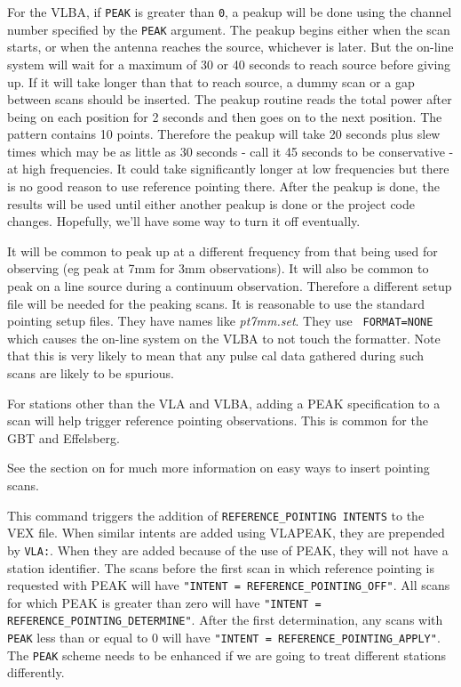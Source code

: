 \documentclass{report}
\begin{document}
For the VLBA, if {\tt PEAK} is greater than {\tt 0}, a peakup will be
done using the channel number specified by the {\tt PEAK} argument.
The peakup begins either when the scan starts, or when the antenna
reaches the source, whichever is later.  But the on-line system will
wait for a maximum of 30 or 40 seconds to reach source before giving
up. If it will take longer than that to reach source, a dummy scan or
a gap between scans should be inserted. The peakup routine reads the
total power after being on each position for 2 seconds and then goes
on to the next position. The pattern contains 10 points. Therefore the
peakup will take 20 seconds plus slew times which may be as little as
30 seconds - call it 45 seconds to be conservative - at high
frequencies. It could take significantly longer at low frequencies but
there is no good reason to use reference pointing there. After the
peakup is done, the results will be used until either another peakup
is done or the project code changes.  Hopefully, we'll have some way
to turn it off eventually.

It will be common to peak up at a different frequency from that being
used for observing (eg peak at 7mm for 3mm observations).  It will
also be common to peak on a line source during a continuum
observation.  Therefore a different setup file will be needed for the
peaking scans.  It is reasonable to use the standard pointing setup
files.  They have names like {\sl pt7mm.set}.  They use {\tt
FORMAT=NONE} which causes the on-line system on the VLBA to
not touch the formatter.  Note that this is very likely to mean
that any pulse cal data gathered during such scans are likely to
be spurious.

For stations other than the VLA and VLBA, adding a PEAK specification
to a scan will help trigger reference pointing observations.  This 
is common for the GBT and Effelsberg.

See the section on  for
much more information on easy ways to insert pointing scans.

This command triggers the addition of {\tt REFERENCE\_POINTING 
INTENTS} to the VEX file.  When similar intents are added using 
VLAPEAK, they are prepended by {\tt VLA:}.  When they are added
because of the use of PEAK, they will not have a station identifier.
The scans before the first scan in which reference pointing is
requested with PEAK will have {\tt "INTENT = REFERENCE\_POINTING\_OFF"}.
All scans for which PEAK is greater than zero will have 
{\tt "INTENT = REFERENCE\_POINTING\_DETERMINE"}.  After the first
determination, any scans with {\tt PEAK} less than or equal to 0 
will have {\tt "INTENT = REFERENCE\_POINTING\_APPLY"}.  The {\tt PEAK}
scheme needs to be enhanced if we are going to treat different 
stations differently.
\end{document}
